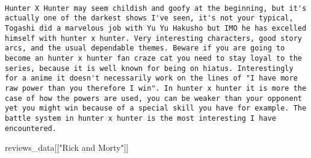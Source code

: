 \documentclass[
]{article}
\newenvironment{Shaded}{\begin{snugshade}}{\end{snugshade}}
\newcommand{\NormalTok}[1]{#1}
\newcommand{\StringTok}[1]{\textcolor[rgb]{0.31,0.60,0.02}{#1}}
\begin{document}
\begin{verbatim}
                                                                                                                                                                                                                                                                                                                                                                                                                                                                                                                                                                                                                                                                                                                                                                                                                                                                            Hunter X Hunter may seem childish and goofy at the beginning, but it's actually one of the darkest shows I've seen, it's not your typical, Togashi did a marvelous job with Yu Yu Hakusho but IMO he has excelled himself with hunter x hunter. Very interesting characters, good story arcs, and the usual dependable themes. Beware if you are going to become an hunter x hunter fan craze cat you need to stay loyal to the series, because it is well known for being on hiatus. Interestingly for a anime it doesn't necessarily work on the lines of "I have more raw power than you therefore I win". In hunter x hunter it is more the case of how the powers are used, you can be weaker than your opponent yet you might win because of a special skill you have for example. The battle system in hunter x hunter is the most interesting I have encountered.
\end{verbatim}

\begin{Shaded}
\begin{Highlighting}[]
\NormalTok{reviews\_data[[}\StringTok{"Rick and Morty"}\NormalTok{]]}
\end{Highlighting}
\end{Shaded}
\end{document}
